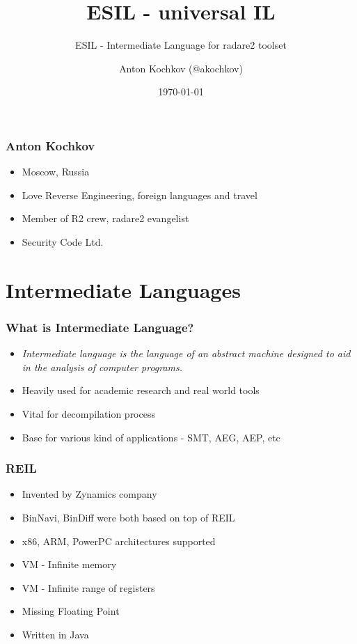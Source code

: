 \documentclass[10pt,pdf,utf8,english,compress,hyperref={unicode}]{beamer}
\title{ESIL - universal IL}
\subtitle{ESIL - Intermediate Language for radare2 toolset}
\author{Anton Kochkov (@akochkov)}
\date{\today}
\institute{ZeroNights 11-2015}
\begin{document}
\maketitle

\begin{frame}[fragile]
  \frametitle{Anton Kochkov}
    \begin{itemize}
    \item Moscow, Russia
    \item Love Reverse Engineering, foreign languages and travel
	\item Member of R2 crew, radare2 evangelist
    \item Security Code Ltd.
    \end{itemize}
\end{frame}

\section{Intermediate Languages}

\begin{frame}[fragile]
  \frametitle{What is Intermediate Language?}
  \begin{itemize}
  \item {\it Intermediate language is the language of an abstract machine designed to aid in the analysis
  of computer programs. \cite{il-wikipedia}}
  \item Heavily used for academic research and real world tools
  \item Vital for decompilation process
  \item Base for various kind of applications - SMT, AEG, AEP, etc
  \end{itemize}
\end{frame}

\begin{frame}[fragile]
  \frametitle{REIL }
  \begin{itemize}
  \item Invented by Zynamics company
  \item BinNavi, BinDiff were both based on top of REIL
  \item x86, ARM, PowerPC architectures supported
  \item VM - Infinite memory
  \item VM - Infinite range of registers
  \item Missing Floating Point
  \item Written in Java
  \end{itemize}
\end{frame}
\end{document}
